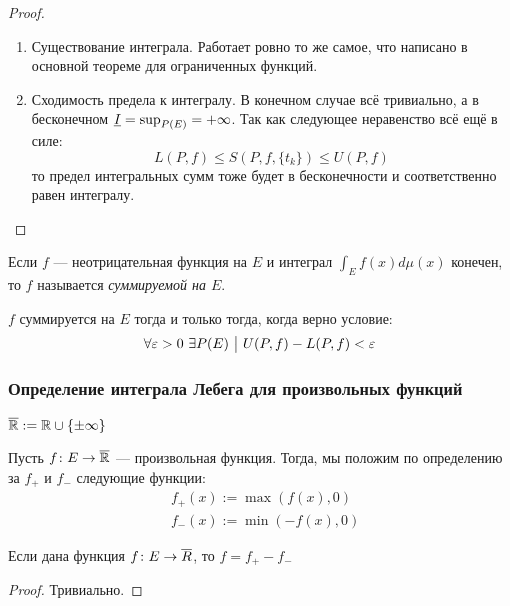 \begin{proof}~
	\begin{enumerate}
		\item Существование интеграла. Работает ровно то же самое, что написано в основной теореме для ограниченных функций.
		
		\item Сходимость предела к интегралу. В конечном случае всё тривиально, а в бесконечном $\underline{I} = \sup_{P(E)} = +\infty$. Так как следующее неравенство всё ещё в силе:
		\[
			L(P, f) \le S(P, f, \{t_k\}) \le U(P, f)
		\]
		то предел интегральных сумм тоже будет в бесконечности и соответственно равен интегралу.
	\end{enumerate}
\end{proof}

\begin{definition}
	Если $f$ --- неотрицательная функция на $E$ и интеграл $\int_E f(x)d\mu(x)$ конечен, то $f$ называется \textit{суммируемой на $E$}.
\end{definition}

\begin{proposition}
	$f$ суммируется на $E$ тогда и только тогда, когда верно условие:
	\[
		\forall \varepsilon > 0\ \exists P(E) \ \big|\  U(P, f) - L(P, f) < \varepsilon
	\]
\end{proposition}

\subsubsection*{Определение интеграла Лебега для произвольных функций}

\begin{reminder}
	$\overline{\mathbb{R}} := \mathbb{R} \cup \{\pm \infty\}$
\end{reminder}

\begin{definition}
	Пусть $f \colon E \to \overline{\mathbb{R}}$ --- произвольная функция. Тогда, мы положим по определению за $f_+$ и $f_-$ следующие функции:
	\begin{align*}
		&{f_+(x) := \max(f(x), 0)}
		\\
		&{f_-(x) := \min(-f(x), 0)}
	\end{align*}
\end{definition}

\begin{proposition}
	Если дана функция $f \colon E \to \overline{R}$, то $f = f_+ - f_-$
\end{proposition}

\begin{proof}
	Тривиально.
\end{proof}

